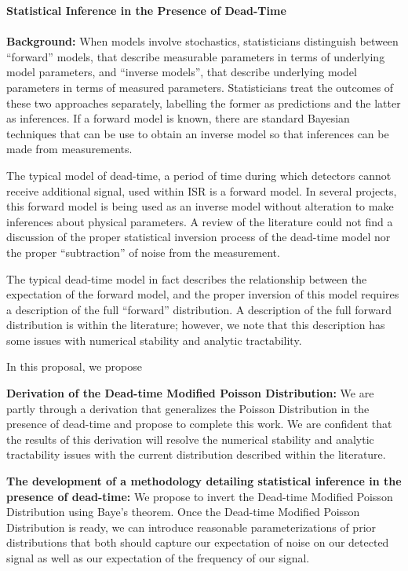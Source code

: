 \documentclass{article}
\begin{document}
{\Large \bf Statistical Inference in the Presence of Dead-Time}\\ \\
\smallskip
{\bf Background:}  When models involve stochastics, statisticians distinguish between ``forward'' models, that describe
measurable parameters in terms of underlying model parameters, and ``inverse models'', that describe underlying model
parameters in terms of measured parameters.  Statisticians treat the outcomes of these two approaches separately, labelling the
former as predictions and the latter as inferences.  If a forward model is known, there are standard Bayesian
techniques that can be use to obtain an inverse model so that inferences can be made from measurements.

  The typical model of dead-time, a period of time during which detectors cannot receive additional signal,
used within ISR is a forward model.
In several projects, this
forward model is being used as an inverse model without alteration to make inferences about physical parameters.
A review of the literature could not find a discussion of the proper statistical inversion process of the dead-time model
nor the proper ``subtraction'' of noise from the measurement.

The typical dead-time model in fact describes the relationship between the expectation of the forward model, and the
proper inversion of this model requires a description of the full ``forward'' distribution.
A description of the full forward distribution is within the literature; however, we
note that this description has some issues with numerical stability and
analytic tractability.

In this proposal, we propose
\begin{enumerate}
	{\item{{\bf Derivation of the Dead-time Modified Poisson Distribution:}  We are partly through a derivation that generalizes
		the Poisson Distribution in the presence of dead-time and propose to complete this work.
		We are confident that the results of this derivation
		will resolve the numerical stability and analytic tractability issues with the current distribution described
		within the literature.}}
	{\item{{\bf The development of a methodology detailing statistical inference in the presence of dead-time:} We propose to invert the Dead-time Modified Poisson Distribution
		using Baye's theorem.  Once the Dead-time Modified Poisson Distribution is ready, we
		can introduce reasonable parameterizations of prior distributions that both should capture our expectation
		of noise on our detected signal as well as our expectation of the frequency of our signal.}}
\end{enumerate}
\end{document}
